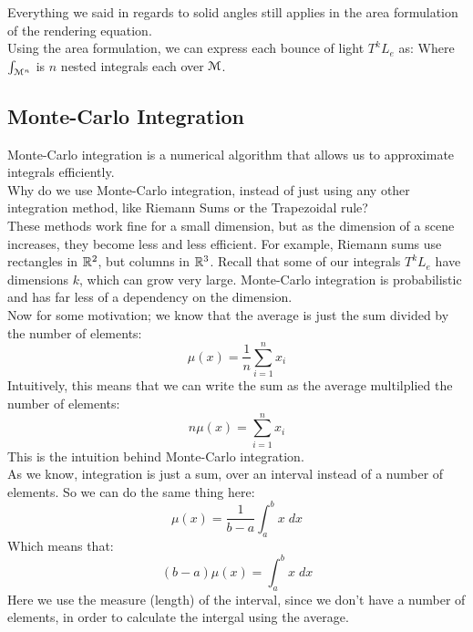 \documentclass[12pt]{article}
\begin{document}
Everything we said in regards to solid angles still
applies in the area formulation of the rendering
equation. \\

Using the area formulation, we can express
each bounce of light $T^kL_e$ as:
Where $\int_{\mathcal{M}^n}$ is $n$ nested integrals
each over $\mathcal{M}$. \\

\newpage

\subsection*{Monte-Carlo Integration}

Monte-Carlo integration is a numerical
algorithm that allows us to approximate
integrals efficiently. \\

Why do we use Monte-Carlo
integration, instead of just using any
other integration method, like Riemann
Sums or the Trapezoidal rule? \\
These methods work fine for a small
dimension, but as the dimension of a scene
increases, they become less and less efficient. 
For example, Riemann sums use rectangles in
$\mathbb{R}^2$, but columns in $\mathbb{R}^3$.
Recall that some of our integrals
$T^kL_e$ have dimensions $k$,
which can grow very large.
Monte-Carlo integration is probabilistic
and has far less of a dependency
on the dimension. \\

Now for some motivation;
we know that the average is just the
sum divided by the number of elements:
\[ \mu(x) = \dfrac{1}{n}\sum_{i=1}^n x_i \]
Intuitively, this means that we can write
the sum as the average multilplied the number
of elements:
\[ n\mu(x) = \sum_{i=1}^n x_i \]
This is the intuition behind Monte-Carlo
integration. \\

As we know, integration is just a sum,
over an interval instead of a number of elements.
So we can do the same thing here:
\[ \mu(x) = \dfrac{1}{b-a}\int_a^b x \; dx \]
Which means that:
\[ (b-a)\mu(x) = \int_a^b x \; dx \]
Here we use the measure (length)
of the interval, since we don't have a number
of elements, in order to calculate the intergal
using the average. \\
\end{document}
